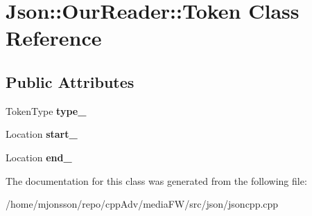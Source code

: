 \hypertarget{classJson_1_1OurReader_1_1Token}{}\section{Json\+:\+:Our\+Reader\+:\+:Token Class Reference}
\label{classJson_1_1OurReader_1_1Token}
\subsection*{Public Attributes}
\begin{DoxyCompactItemize}
\item 
\mbox{\label{classJson_1_1OurReader_1_1Token_abe7d858530396fa7e1293f7a579880ed}} 
Token\+Type {\bfseries type\+\_\+}
\item 
\mbox{\label{classJson_1_1OurReader_1_1Token_aedf68bb00eaaa9d3c22b9825999602ac}} 
Location {\bfseries start\+\_\+}
\item 
\mbox{\label{classJson_1_1OurReader_1_1Token_a67d2071638add857528579ae3791eccc}} 
Location {\bfseries end\+\_\+}
\end{DoxyCompactItemize}


The documentation for this class was generated from the following file\+:\begin{DoxyCompactItemize}
\item 
/home/mjonsson/repo/cpp\+Adv/media\+F\+W/src/json/jsoncpp.\+cpp\end{DoxyCompactItemize}
